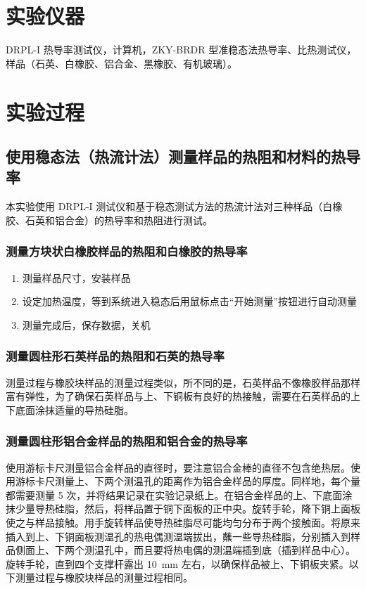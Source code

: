 \documentclass[a4paper,utf8]{article}
\begin{document}
\section{实验仪器}%
    DRPL-I 热导率测试仪，计算机，ZKY-BRDR 型准稳态法热导率、比热测试仪，样品（石英、白橡胶、铝合金、黑橡胶、有机玻璃）。
    \section{实验过程}%
    \subsection{使用稳态法（热流计法）测量样品的热阻和材料的热导率}
    本实验使用 DRPL-I 测试仪和基于稳态测试方法的热流计法对三种样品（白橡胶、石英和铝合金）的热导率和热阻进行测试。
        \subsubsection{测量方块状白橡胶样品的热阻和白橡胶的热导率}
        \begin{enumerate}
            \item 测量样品尺寸，安装样品
            \item 设定加热温度，等到系统进入稳态后用鼠标点击“开始测量”按钮进行自动测量
            \item 测量完成后，保存数据，关机
        \end{enumerate}
        \subsubsection{测量圆柱形石英样品的热阻和石英的热导率}
        测量过程与橡胶块样品的测量过程类似，所不同的是，石英样品不像橡胶样品那样富有弹性，为了确保石英样品与上、下铜板有良好的热接触，需要在石英样品的上下底面涂抹适量的导热硅脂。
        \subsubsection{测量圆柱形铝合金样品的热阻和铝合金的热导率}
        使用游标卡尺测量铝合金样品的直径时，要注意铝合金棒的直径不包含绝热层。使用游标卡尺测量上、下两个测温孔的距离作为铝合金样品的厚度。同样地，每个量都需要测量 5 次，并将结果记录在实验记录纸上。在铝合金样品的上、下底面涂抹少量导热硅脂，然后，将样品置于铜下面板的正中央。旋转手轮，降下铜上面板使之与样品接触。用手旋转样品使导热硅脂尽可能均匀分布于两个接触面。将原来插入到上、下铜面板测温孔的热电偶测温端拔出，蘸一些导热硅脂，分别插入到样品侧面上、下两个测温孔中，而且要将热电偶的测温端插到底（插到样品中心）。旋转手轮，直到四个支撑杆露出 \SI{10}{\mm} 左右，以确保样品被上、下铜板夹紧。以下测量过程与橡胶块样品的测量过程相同。
\end{document}

